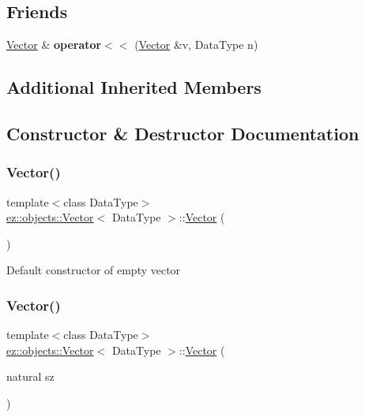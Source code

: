 \subsection*{Friends}
\begin{DoxyCompactItemize}
\item 
\mbox{\label{classez_1_1objects_1_1Vector_ace48be602ed1ae3d276b4f458b9302c6}} 
\hyperlink{classez_1_1objects_1_1Vector}{Vector} \& {\bfseries operator$<$$<$} (\hyperlink{classez_1_1objects_1_1Vector}{Vector} \&v, Data\+Type n)
\end{DoxyCompactItemize}
\subsection*{Additional Inherited Members}


\subsection{Constructor \& Destructor Documentation}
\mbox{\label{classez_1_1objects_1_1Vector_aa038e392499b2feed97b02a56ca949c1}} 
\subsubsection{\texorpdfstring{Vector()}{Vector()}\hspace{0.1cm}{\footnotesize\ttfamily [1/4]}}
{\footnotesize\ttfamily template$<$class Data\+Type$>$ \\
\hyperlink{classez_1_1objects_1_1Vector}{ez\+::objects\+::\+Vector}$<$ Data\+Type $>$\+::\hyperlink{classez_1_1objects_1_1Vector}{Vector} (\begin{DoxyParamCaption}{ }\end{DoxyParamCaption})\hspace{0.3cm}{\ttfamily [inline]}}

Default constructor of empty vector \mbox{\label{classez_1_1objects_1_1Vector_a5eb6b99b1017a86ef85edc6a205295ea}} 
\subsubsection{\texorpdfstring{Vector()}{Vector()}\hspace{0.1cm}{\footnotesize\ttfamily [2/4]}}
{\footnotesize\ttfamily template$<$class Data\+Type$>$ \\
\hyperlink{classez_1_1objects_1_1Vector}{ez\+::objects\+::\+Vector}$<$ Data\+Type $>$\+::\hyperlink{classez_1_1objects_1_1Vector}{Vector} (\begin{DoxyParamCaption}\item[{natural}]{sz }\end{DoxyParamCaption})\hspace{0.3cm}{\ttfamily [inline]}}

